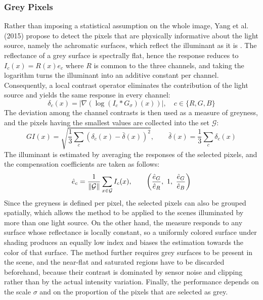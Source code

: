 \subsubsection{Grey Pixels}
\label{algorithm:grey_pixels}
Rather than imposing a statistical assumption on the whole image, Yang et al. (2015) propose to detect the pixels that are physically informative about the light source, namely the achromatic surfaces, which reflect the illuminant as it is \cite{yangGrayPixels}. The reflectance of a grey surface is spectrally flat, hence the response reduces to $I_c(x) = R(x) e_c$ where $R$ is common to the three channels, and taking the logarithm turns the illuminant into an additive constant per channel. Consequently, a local contrast operator eliminates the contribution of the light source and yields the same response in every channel:
\begin{equation}
\delta_c(x) = \left| \nabla \left( \log \left( I_c * G_{\sigma} \right) (x) \right) \right|, \quad c \in \{R, G, B\}
\end{equation}
The deviation among the channel contrasts is then used as a measure of greyness, and the pixels having the smallest values are collected into the set $\mathcal{G}$:
\begin{equation}
GI(x) = \sqrt{\frac{1}{3} \sum_{c} \left( \delta_c(x) - \bar{\delta}(x) \right)^2}, \qquad \bar{\delta}(x) = \frac{1}{3} \sum_{c} \delta_c(x)
\end{equation}
The illuminant is estimated by averaging the responses of the selected pixels, and the compensation coefficients are taken as follows:
\begin{equation}
\hat{e}_c = \frac{1}{\left\lVert\mathcal{G}\right\rVert} \sum_{x \in \mathcal{G}} I_c(x), \qquad \left( \frac{\hat{e}_G}{\hat{e}_R}, \,\, 1, \,\, \frac{\hat{e}_G}{\hat{e}_B} \right)
\end{equation}
Since the greyness is defined per pixel, the selected pixels can also be grouped spatially, which allows the method to be applied to the scenes illuminated by more than one light source. On the other hand, the measure responds to any surface whose reflectance is locally constant, so a uniformly colored surface under shading produces an equally low index and biases the estimation towards the color of that surface. The method further requires grey surfaces to be present in the scene, and the near-flat and saturated regions have to be discarded beforehand, because their contrast is dominated by sensor noise and clipping rather than by the actual intensity variation. Finally, the performance depends on the scale $\sigma$ and on the proportion of the pixels that are selected as grey.

